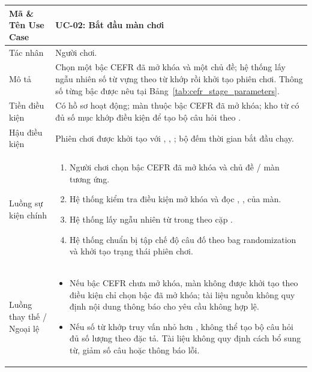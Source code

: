 \begin{xltabular}{\textwidth}{|L{3.3cm}|Y|}
\textbf{Mã \& Tên Use Case} & \textbf{UC-02: Bắt đầu màn chơi} \\ \hline
Tác nhân & Người chơi. \\ \hline
Mô tả & Chọn một bậc CEFR đã mở khóa và một chủ đề; hệ thống lấy ngẫu nhiên số từ vựng theo  từ  khớp  rồi khởi tạo phiên chơi. Thông số từng bậc được nêu tại Bảng~\ref{tab:cefr_stage_parameters}. \\ \hline
Tiền điều kiện & Có hồ sơ hoạt động; màn thuộc bậc CEFR đã mở khóa; kho từ có đủ số mục khớp điều kiện để tạo bộ câu hỏi theo . \\ \hline
Hậu điều kiện & Phiên chơi được khởi tạo với , , ; bộ đếm thời gian bắt đầu chạy. \\ \hline
Luồng sự kiện chính &
\begin{enumerate}[nosep,leftmargin=*]
    \item Người chơi chọn bậc CEFR đã mở khóa và chủ đề / màn tương ứng.
    \item Hệ thống kiểm tra điều kiện mở khóa và đọc , ,  của màn.
    \item Hệ thống lấy ngẫu nhiên  từ trong  theo cặp .
    \item Hệ thống chuẩn bị tập chế độ câu đố theo bag randomization và khởi tạo trạng thái phiên chơi.
\end{enumerate} \\ \hline
Luồng thay thế / Ngoại lệ &
\begin{itemize}[nosep,leftmargin=*]
    \item Nếu bậc CEFR chưa mở khóa, màn không được khởi tạo theo điều kiện chỉ chọn bậc đã mở khóa; tài liệu nguồn không quy định nội dung thông báo cho yêu cầu không hợp lệ.
    \item Nếu số từ khớp truy vấn nhỏ hơn , không thể tạo bộ câu hỏi đủ số lượng theo đặc tả. Tài liệu không quy định cách bổ sung từ, giảm số câu hoặc thông báo lỗi.
\end{itemize} \\ \hline


\end{xltabular}

